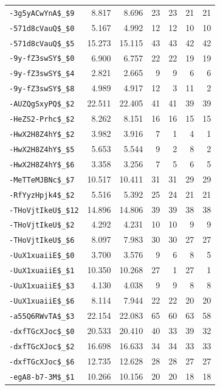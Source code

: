 \begin{longtable}{@{}lrrrrrr@{}}
\nolinkurl{-3g5yACwYnA$_$9} & 8.817 & 8.696 & 23 & 23 & 21 & 21\\
\nolinkurl{-571d8cVauQ$_$0} & 5.167 & 4.992 & 12 & 12 & 10 & 10\\
\nolinkurl{-571d8cVauQ$_$5} & 15.273 & 15.115 & 43 & 43 & 42 & 42\\
\nolinkurl{-9y-fZ3swSY$_$0} & 6.900 & 6.757 & 22 & 22 & 19 & 19\\
\nolinkurl{-9y-fZ3swSY$_$4} & 2.821 & 2.665 & 9 & 9 & 6 & 6\\
\nolinkurl{-9y-fZ3swSY$_$8} & 4.989 & 4.917 & 12 & 3 & 11 & 2\\
\nolinkurl{-AUZQgSxyPQ$_$2} & 22.511 & 22.405 & 41 & 41 & 39 & 39\\
\nolinkurl{-HeZS2-Prhc$_$2} & 8.262 & 8.151 & 16 & 16 & 15 & 15\\
\nolinkurl{-HwX2H8Z4hY$_$2} & 3.982 & 3.916 & 7 & 1 & 4 & 1\\
\nolinkurl{-HwX2H8Z4hY$_$5} & 5.653 & 5.544 & 9 & 2 & 8 & 2\\
\nolinkurl{-HwX2H8Z4hY$_$6} & 3.358 & 3.256 & 7 & 5 & 6 & 5\\
\nolinkurl{-MeTTeMJBNc$_$7} & 10.517 & 10.411 & 31 & 31 & 29 & 29\\
\nolinkurl{-RfYyzHpjk4$_$2} & 5.516 & 5.392 & 25 & 24 & 21 & 21\\
\nolinkurl{-THoVjtIkeU$_$12} & 14.896 & 14.806 & 39 & 39 & 38 & 38\\
\nolinkurl{-THoVjtIkeU$_$2} & 4.292 & 4.231 & 10 & 10 & 9 & 9\\
\nolinkurl{-THoVjtIkeU$_$6} & 8.097 & 7.983 & 30 & 30 & 27 & 27\\
\nolinkurl{-UuX1xuaiiE$_$0} & 3.700 & 3.576 & 9 & 6 & 8 & 5\\
\nolinkurl{-UuX1xuaiiE$_$1} & 10.350 & 10.268 & 27 & 1 & 27 & 1\\
\nolinkurl{-UuX1xuaiiE$_$3} & 4.130 & 4.038 & 9 & 9 & 8 & 8\\
\nolinkurl{-UuX1xuaiiE$_$6} & 8.114 & 7.944 & 22 & 22 & 20 & 20\\
\nolinkurl{-a55Q6RWvTA$_$3} & 22.154 & 22.083 & 65 & 60 & 63 & 58\\
\nolinkurl{-dxfTGcXJoc$_$0} & 20.533 & 20.410 & 40 & 33 & 39 & 32\\
\nolinkurl{-dxfTGcXJoc$_$2} & 16.698 & 16.633 & 34 & 34 & 33 & 33\\
\nolinkurl{-dxfTGcXJoc$_$6} & 12.735 & 12.628 & 28 & 28 & 27 & 27\\
\nolinkurl{-egA8-b7-3M$_$1} & 10.266 & 10.156 & 20 & 20 & 18 & 18\\

\end{longtable}
